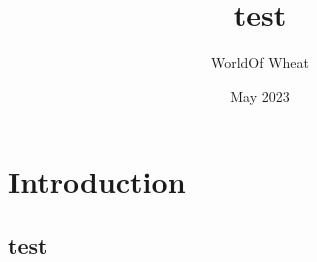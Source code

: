 \documentclass{article}
\title{test}
\author{WorldOf Wheat}
\date{May 2023}
\begin{document}
\maketitle

\section{Introduction}
\subsection{test}
\end{document}
